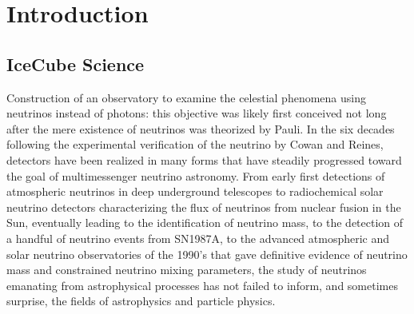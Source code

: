 
\section{Introduction}
\label{sec:intro}

\subsection{IceCube Science}
Construction of an observatory to examine the celestial phenomena using
neutrinos instead of photons: this objective was likely first conceived not long
after the mere existence of neutrinos was theorized by Pauli. In the six decades
following the experimental verification of the neutrino by Cowan and Reines,
detectors have been realized in many forms that have steadily progressed toward
the goal of multimessenger neutrino astronomy. From early first detections of
atmospheric neutrinos in deep underground telescopes \cite{Witwatersrand,KGF} to
radiochemical solar neutrino detectors characterizing the flux of neutrinos from
nuclear fusion in the Sun\cite{Homestake, GALLEX}, eventually leading to the
identification of neutrino mass, to the detection of a handful of neutrino
events from SN1987A\cite{SK1987A,IMB1987A,BUST1987A}, to the advanced
atmospheric and solar neutrino observatories of the 1990's that gave definitive
evidence of neutrino mass and constrained neutrino mixing
parameters\cite{SK,SNO}, the study of neutrinos emanating from astrophysical
processes has not failed to inform, and sometimes surprise, the fields of
astrophysics and particle physics.


